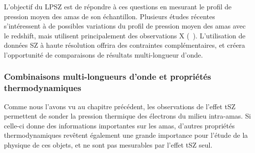 L'objectif du LPSZ est de répondre à ces questions en mesurant le profil de pression moyen des amas de son échantillon.
Plusieurs études récentes s'intéressent à de possibles variations du profil de pression moyen des amas avec le redshift, mais utilisent principalement des observations X (\eg\ \cite{mcdonald_redshift_2014, ghirardini_evolution_2021}).
L'utilisation de données SZ à haute résolution offrira des contraintes complémentaires, et créera l'opportunité de comparaisons de résultats multi-longueur d'onde.

\subsubsection{Combinaisons multi-longueurs d'onde et propriétés thermodynamiques} %
Comme nous l'avons vu au chapitre précédent, les observations de l'effet tSZ permettent de sonder la pression thermique des électrons du milieu intra-amas.
Si celle-ci donne des informations importantes sur les amas, d'autres propriétés thermodynamiques revêtent également une grande importance pour l'étude de la physique de ces objets, et ne sont pas mesurables par l'effet tSZ seul.

